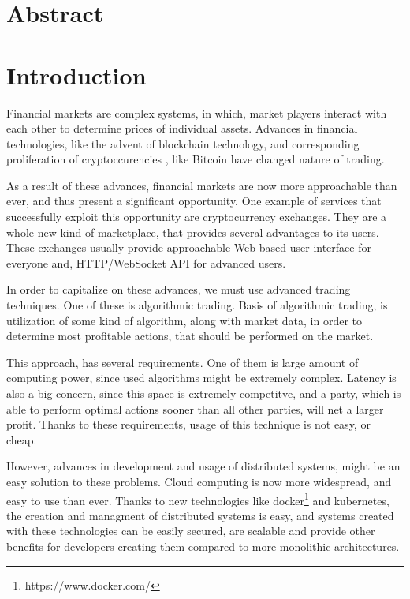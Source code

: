 \providecommand*{\listingautorefname}{Code sample}

\newcommand{\trait}[1]{{#1}}

\newcommand{\type}[1]{{#1}}
\newcommand{\fun}[1]{{#1}}
\newcommand{\kubecomp}[1]{{#1}}
\newcommand{\actor}[1]{{#1}}
\newcommand{\msg}[1]{{#1}}

\chapter*{Abstract}
\label{abstract}

\chapter{Introduction}
\label{chapter:introduction}
Financial markets are complex systems, in which, market players interact with each other to determine
prices of individual assets. Advances in financial technologies, like the advent of blockchain technology,
and corresponding proliferation of cryptoccurencies , like Bitcoin\cite{bitcoin} have changed nature of trading.

As a result of these advances, financial markets are now more approachable than ever, and thus present a significant
opportunity. One example of services that successfully exploit this opportunity are cryptocurrency exchanges. They
are a whole new kind of marketplace, that provides several advantages to its users. These exchanges usually provide
approachable Web based user interface for everyone and, HTTP/WebSocket API for advanced users.

In order to capitalize on these advances, we must use advanced trading techniques. One of these is algorithmic
trading. Basis of algorithmic trading, is utilization of some kind of algorithm, along with market data, in
order to determine most profitable actions, that should be performed on the market.

This approach, has several requirements. One of them is large amount of computing power, since used algorithms
might be extremely complex. Latency is also a big concern, since this space is extremely competitve, and a party,
which is able to perform optimal actions sooner than all other parties, will net a larger profit.
Thanks to these requirements, usage of this technique is not easy, or cheap.

However, advances in development and usage of distributed systems, might be an easy solution to these problems.
Cloud computing\cite{wiki:cloud} is now more widespread, and easy to use than ever. Thanks to new technologies like
docker\footnote{https://www.docker.com/} and kubernetes\cite{web:k8s}, the creation and managment of distributed systems is easy,
and systems created with these technologies can be easily secured, are scalable and provide other benefits
for developers creating them compared to more monolithic architectures.

